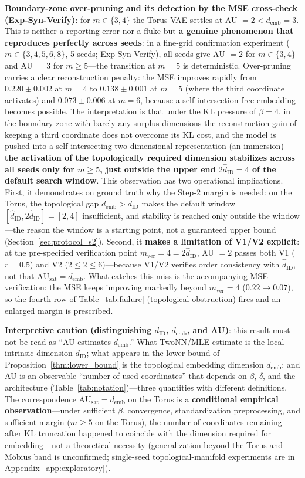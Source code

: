 \documentclass[make,article,submit,pdftex,moreauthors]{Definitions/mdpi}
\newcommand{\dID}{d_{\mathrm{ID}}}
\newcommand{\hatdID}{\hat{d}_{\mathrm{ID}}}
\newcommand{\AUsat}{\mathrm{AU}_{\mathrm{sat}}}
\newcommand{\demb}{d_{\mathrm{emb}}}
\begin{document}
\textbf{Boundary-zone over-pruning and its detection by the MSE
cross-check (Exp-Syn-Verify)}:
for $m \in \{3, 4\}$ the Torus VAE settles at AU $= 2 < \demb = 3$.
This is neither a reporting error nor a fluke but \textbf{a genuine
phenomenon that reproduces perfectly across seeds}: in a fine-grid
confirmation experiment ($m \in \{3, 4, 5, 6, 8\}$, 5 seeds;
Exp-Syn-Verify), all seeds give AU $= 2$ for $m \in \{3, 4\}$ and
AU $= 3$ for $m \geq 5$---the transition at $m = 5$ is deterministic.
Over-pruning carries a clear reconstruction penalty: the MSE improves
rapidly from $0.220 \pm 0.002$ at $m = 4$ to $0.138 \pm 0.001$ at $m = 5$
(where the third coordinate activates) and $0.073 \pm 0.006$ at $m = 6$,
because a self-intersection-free embedding becomes possible.
The interpretation is that under the KL pressure of $\beta = 4$, in the
boundary zone with barely any surplus dimensions the reconstruction gain of
keeping a third coordinate does not overcome its KL cost, and the model is
pushed into a self-intersecting two-dimensional representation (an
immersion)---\textbf{the activation of the topologically required dimension
stabilizes across all seeds only for $m \geq 5$, just outside the upper end
$2\hatdID = 4$ of the default search window}.
This observation has two operational implications.
First, it demonstrates on ground truth why the Step-2 margin is needed: on
the Torus, the topological gap $\demb > \dID$ makes the default window
$[\hatdID, 2\hatdID] = [2, 4]$ insufficient, and stability is reached only
outside the window---the reason the window is a starting point, not a
guaranteed upper bound (Section~\ref{sec:protocol_s2}).
Second, it \textbf{makes a limitation of V1/V2 explicit}: at the
pre-specified verification point $m_{\mathrm{ver}} = 4 = 2\hatdID$, AU
$= 2$ passes both V1 ($r = 0.5$) and V2 ($2 \leq 2 \leq 6$)---because
V1/V2 verifies order consistency with $\hatdID$, not that
$\AUsat = \demb$.
What catches this miss is the accompanying MSE verification: the MSE keeps
improving markedly beyond $m_{\mathrm{ver}} = 4$ ($0.22 \to 0.07$), so the
fourth row of Table~\ref{tab:failure} (topological obstruction) fires and
an enlarged margin is prescribed.

\textbf{Interpretive caution (distinguishing $\dID$, $\demb$, and AU)}:
this result must not be read as ``AU estimates $\demb$.''
What TwoNN/MLE estimate is the local intrinsic dimension $\dID$; what
appears in the lower bound of Proposition~\ref{thm:lower_bound} is the
topological embedding dimension $\demb$; and AU is an observable ``number of
used coordinates'' that depends on $\beta$, $\delta$, and the architecture
(Table~\ref{tab:notation})---three quantities with different definitions.
The correspondence $\AUsat = \demb$ on the Torus is a \textbf{conditional
empirical observation}---under sufficient $\beta$, convergence,
standardization preprocessing, and sufficient margin ($m \geq 5$ on the
Torus), the number of coordinates remaining after KL
truncation happened to coincide with the dimension required for
embedding---not a theoretical necessity
(generalization beyond the Torus and M\"obius band is unconfirmed;
single-seed topological-manifold experiments are in
Appendix~\ref{app:exploratory}).
\end{document}
